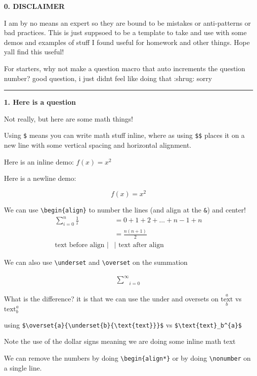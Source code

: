 \documentclass{article}
\begin{document}
\noindent \textbf{0. DISCLAIMER}

I am by no means an expert so they are bound to be mistakes or anti-patterns or bad practices. This is just suppsoed to be a template to take and use with some demos and examples of stuff I found useful for homework and other things. Hope yall find this useful!

For starters, why not make a question macro that auto increments the question number? good question, i just didnt feel like doing that :shrug: sorry

\noindent\rule{\textwidth}{0.5pt}

\noindent \textbf{1. Here is a question }

Not really, but here are some math things!

Using \verb+$+ means you can write math stuff inline, where as using \verb+$$+ places it on a new line with some vertical spacing and horizontal alignment.

Here is an inline demo: $f(x)=x^{2}$

Here is a newline demo:

$$ f(x) = x^{2} $$

We can use \verb+\begin{align}+ to number the lines (and align at the \verb+&+) and center!
\begin{align}
    \sum_{i=0}^{n} \frac{1}{i} &= 0 + 1 + 2 + \hdots + n-1 + n \\
    &= \frac{n(n+1)}{2} \\
    \text{text before align $|$}&\text{$|$ text after align}
\end{align}

We can also use \verb+\underset+ and \verb+\overset+ on the summation

\begin{align}
    \underset{i=0}{\overset{\infty}{\sum}} 
\end{align}

What is the difference? it is that we can use the under and oversets on $\overset{a}{\underset{b}{\text{text}}}$ 
vs
$\text{text}_b^{a}$ 

using \verb+$\overset{a}{\underset{b}{\text{text}}}$+ vs \verb+$\text{text}_b^{a}$ +

Note the use of the dollar signs meaning we are doing some inline math text

We can remove the numbers by doing \verb+\begin{align*}+ or by doing \verb+\nonumber+ on a single line.
\end{document}
